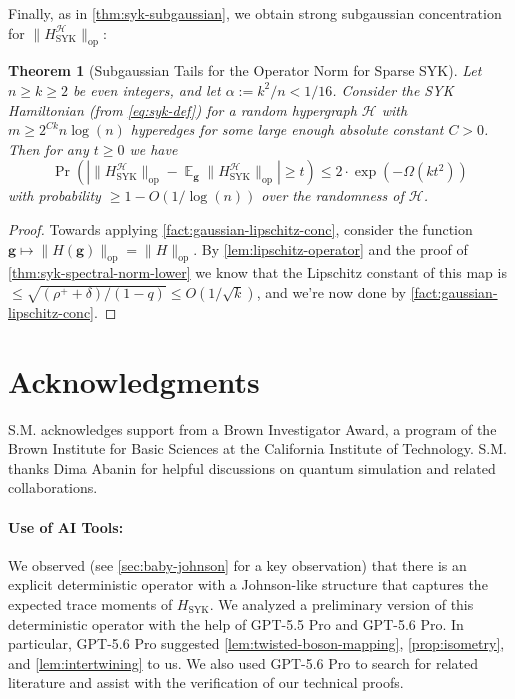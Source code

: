 \documentclass
[11pt,letterpaper]
{article}
\newtheorem{theorem}{Theorem}[section]
\theoremstyle{definition}
\newcommand{\op}{\operatorname{op}}
\newcommand{\1}{\mathbf{1}}
\newcommand{\cH}{\mathcal H}
\DeclareMathOperator*{\E}{\mathbb{E}}
\renewcommand{\geq}{\geqslant}
\renewcommand{\leq}{\leqslant}
\newcommand{\syk}{\operatorname{SYK}}
\begin{document}
Finally, as in \cref{thm:syk-subgaussian}, we obtain strong subgaussian concentration for $\|H^\cH_{\syk}\|_{\op}$:

\begin{theorem}[Subgaussian Tails for the Operator Norm for Sparse SYK]\label{thm:syk-subgaussian-sparse}
    Let $n\geq k\geq 2$ be even integers, and let $\alpha:= k^2/n < 1/16$. Consider the SYK Hamiltonian (from \cref{eq:syk-def}) for a random hypergraph $\cH$ with $m\geq 2^{Ck}n\log(n)$ hyperedges for some large enough absolute constant $C > 0$. Then for any $t\geq 0$ we have
    \[\Pr\left(|\|H^\cH_{\syk}\|_{\operatorname{op}} - \E_{\bm g}\|H^\cH_{\syk}\|_{\operatorname{op}}|\geq t\right)\leq 2\cdot\exp\left(-\Omega(kt^2)\right)\]
    with probability $\geq 1 - O(1/\log(n))$ over the randomness of $\cH$.
\end{theorem}
\begin{proof}
    Towards applying \cref{fact:gaussian-lipschitz-conc}, consider the function $\bm g\mapsto \|H(\bm g)\|_{\op} = \|H\|_{\op}$. By \cref{lem:lipschitz-operator} and the proof of \cref{thm:syk-spectral-norm-lower} we know that the Lipschitz constant of this map is $\leq\sqrt{(\rho^+ + \delta)/(1 - q)}\leq O(1/\sqrt{k})$, and we're now done by \cref{fact:gaussian-lipschitz-conc}.
\end{proof}

\section{Acknowledgments}

S.M. acknowledges support from a Brown Investigator Award, a program of the Brown Institute for Basic Sciences at the California Institute of Technology. S.M. thanks Dima Abanin for helpful discussions on quantum simulation and related collaborations.


\paragraph{Use of AI Tools:} We observed (see \cref{sec:baby-johnson} for a key observation) that there is an explicit deterministic operator with a Johnson-like structure that captures the expected trace moments of $H_{\syk}$. We analyzed a preliminary version of this deterministic operator with the help of GPT-5.5 Pro and GPT-5.6 Pro. In particular, GPT-5.6 Pro suggested \cref{lem:twisted-boson-mapping}, \cref{prop:isometry}, and \cref{lem:intertwining} to us. We also used GPT-5.6 Pro to search for related literature and assist with the verification of our technical proofs. 



\end{document}
